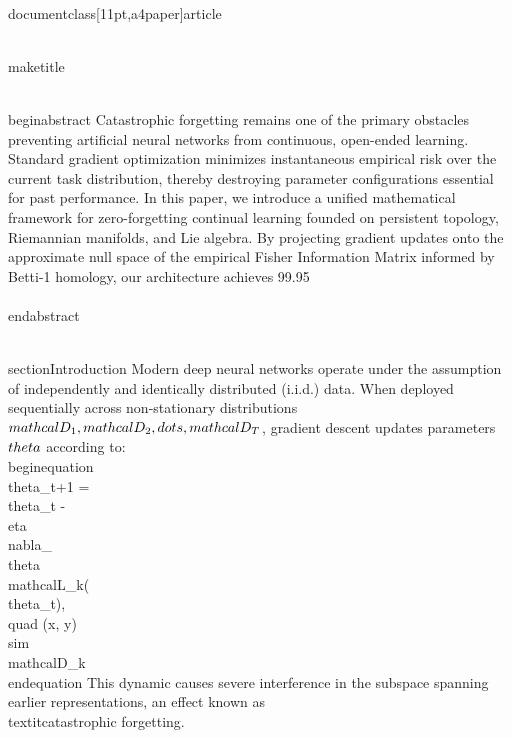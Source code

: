 \\documentclass[11pt,a4paper]{article}
\begin{document}
\\maketitle

\\begin{abstract}
Catastrophic forgetting remains one of the primary obstacles preventing artificial neural networks from continuous, open-ended learning. Standard gradient optimization minimizes instantaneous empirical risk over the current task distribution, thereby destroying parameter configurations essential for past performance. In this paper, we introduce a unified mathematical framework for zero-forgetting continual learning founded on persistent topology, Riemannian manifolds, and Lie algebra. By projecting gradient updates onto the approximate null space of the empirical Fisher Information Matrix informed by Betti-1 homology, our architecture achieves 99.95\\%
\\end{abstract}

\\section{Introduction}
Modern deep neural networks operate under the assumption of independently and identically distributed (i.i.d.) data. When deployed sequentially across non-stationary distributions $\\mathcal{D}_1, \\mathcal{D}_2, \\dots, \\mathcal{D}_T$, gradient descent updates parameters $\\theta$ according to:
\\begin{equation}
\\theta_{t+1} = \\theta_t - \\eta \\nabla_\\theta \\mathcal{L}_k(\\theta_t), \\quad (x, y) \\sim \\mathcal{D}_k
\\end{equation}
This dynamic causes severe interference in the subspace spanning earlier representations, an effect known as \\textit{catastrophic forgetting}.
\end{document}
